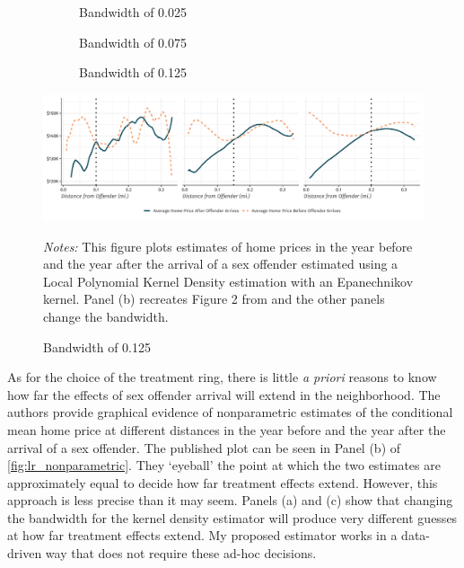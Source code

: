 \documentclass[10pt]{article}
\begin{document}
\begin{figure}[htb!]
    \caption{Price Gradient of Distance from Offender}\label{fig:lr_nonparametric}


    \begin{subfigure}{0.33\textwidth}
        \caption{Bandwidth of 0.025}
    \end{subfigure}
    \begin{subfigure}{0.33\textwidth}
        \caption{Bandwidth of 0.075}
    \end{subfigure}
    \begin{subfigure}{0.33\textwidth}
        \caption{Bandwidth of 0.125}
    \end{subfigure}
    
    \vspace{-3mm}
    \includegraphics[width=\textwidth]{../../figures/linden_rockoff_nonparametric.pdf}
    

    {\footnotesize{\it Notes:} This figure plots estimates of home prices in the year before and the year after the arrival of a sex offender estimated using a Local Polynomial Kernel Density estimation with an Epanechnikov kernel. Panel (b) recreates Figure 2 from \citet{Linden_Rockoff_2008} and the other panels change the bandwidth.}
\end{figure}

As for the choice of the treatment ring, there is little \emph{a priori} reasons to know how far the effects of sex offender arrival will extend in the neighborhood. The authors provide graphical evidence of nonparametric estimates of the conditional mean home price at different distances in the year before and the year after the arrival of a sex offender. The published plot can be seen in Panel (b) of \autoref{fig:lr_nonparametric}. They `eyeball' the point at which the two estimates are approximately equal to decide how far treatment effects extend. However, this approach is less precise than it may seem. Panels (a) and (c) show that changing the bandwidth for the kernel density estimator will produce very different guesses at how far treatment effects extend. My proposed estimator works in a data-driven way that does not require these ad-hoc decisions.
\end{document}
